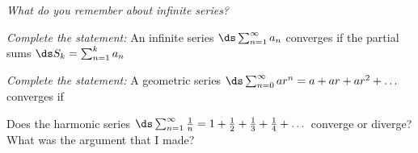 \emph{What do you remember about infinite series?}

{\small
\medskip \noindent \emph{Complete the statement:} An infinite series $\ds \sum_{n=1}^\infty a_n$ converges if the partial sums $\ds S_k=\sum_{n=1}^k a_n$

\vspace{16mm}

\medskip \noindent \emph{Complete the statement:} A geometric series $\ds \sum_{n=0}^\infty a r^n = a + a r + a r^2 + \dots$ converges if

\vspace{15mm}

\medskip \noindent Does the harmonic series $\ds \sum_{n=1}^\infty \frac{1}{n} = 1 + \frac{1}{2} + \frac{1}{3} + \frac{1}{4} + \dots$ converge or diverge?  What was the argument that I made?

\vspace{20mm}
}